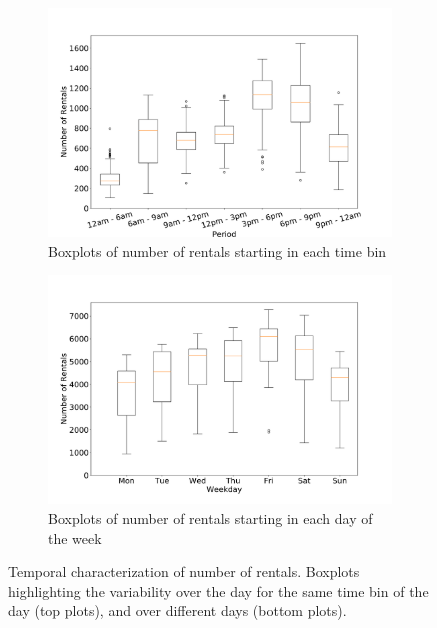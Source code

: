 \begin{figure}
    \begin{center}
        \begin{subfigure}{0.65\columnwidth}
            \includegraphics[width=\columnwidth]{figures/temporal_characterization/AverageBookingsPeriod.pdf}
             \caption{Boxplots of number of rentals starting in each time bin
             \vspace{0.5cm}}
             \label{fig:rentals-per-period}
        \end{subfigure}
        \begin{subfigure}{0.65\columnwidth}
            \includegraphics[width=\columnwidth]{figures/temporal_characterization/AverageBookingsWeekday.pdf}
             \caption{Boxplots of number of rentals starting in each day of the week}
             \label{fig:rentals-per-weekday}
        \end{subfigure}
        \caption{Temporal characterization of number of rentals. Boxplots highlighting the variability over the day for the same time bin of the day (top plots), and over different days (bottom plots).}
    \end{center}
\end{figure}


